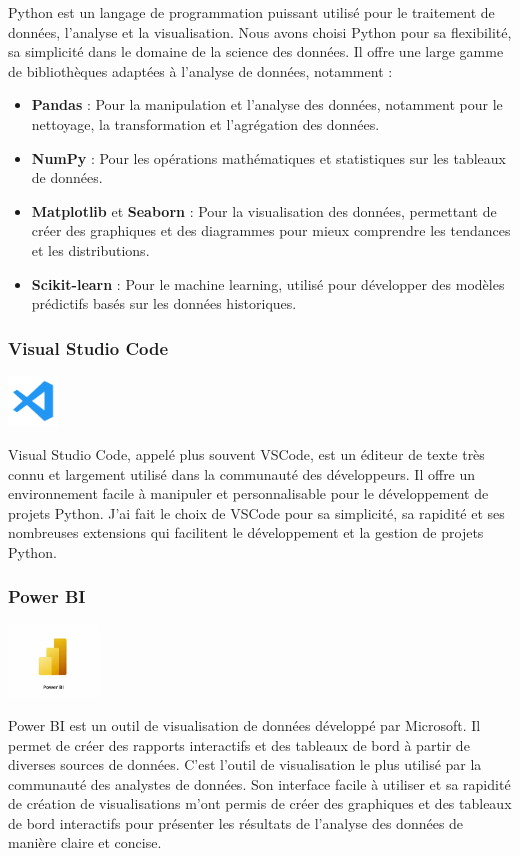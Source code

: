 Python est un langage de programmation puissant utilisé pour le traitement de données, l'analyse et la visualisation.  
Nous avons choisi Python pour sa flexibilité, sa simplicité dans le domaine de la science des données.  
Il offre une large gamme de bibliothèques adaptées à l'analyse de données, notamment :
\begin{itemize}
    \item \textbf{Pandas} : Pour la manipulation et l'analyse des données, notamment pour le nettoyage, la transformation et l'agrégation des données.
    \item \textbf{NumPy} : Pour les opérations mathématiques et statistiques sur les tableaux de données.
    \item \textbf{Matplotlib} et \textbf{Seaborn} : Pour la visualisation des données, permettant de créer des graphiques et des diagrammes pour mieux comprendre les tendances et les distributions.
    \item \textbf{Scikit-learn} : Pour le machine learning, utilisé pour développer des modèles prédictifs basés sur les données historiques.
\end{itemize}

\subsubsection{Visual Studio Code}
\begin{center}
    \includegraphics[width=0.1\textwidth]{image/vscode.png} 
\end{center}
Visual Studio Code, appelé plus souvent VSCode, est un éditeur de texte très connu et largement utilisé dans la communauté des développeurs.  
Il offre un environnement facile à manipuler et personnalisable pour le développement de projets Python. J'ai fait le choix de VSCode pour sa simplicité, sa rapidité et ses nombreuses extensions qui facilitent le développement et la gestion de projets Python.

\subsubsection{Power BI}
\begin{center}
    \includegraphics[width=0.18\textwidth]{image/powerbi.jpg} 
\end{center} 
Power BI est un outil de visualisation de données développé par Microsoft. Il permet de créer des rapports interactifs et des tableaux de bord à partir de diverses sources de données. C'est l'outil de visualisation le plus utilisé par la communauté des analystes de données. Son interface facile à utiliser et sa rapidité de création de visualisations m'ont permis de créer des graphiques et des tableaux de bord interactifs pour présenter les résultats de l'analyse des données de manière claire et concise. 

